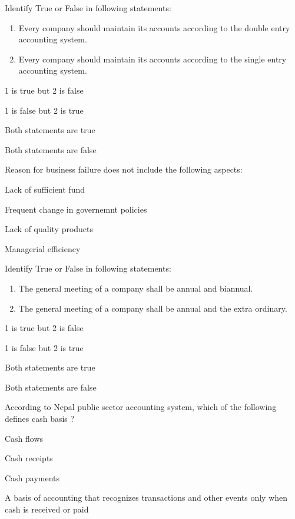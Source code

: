 \begin{questions}
\question Identify True or False in following statements:
  \begin{enumerate}
  \item Every company should maintain its accounts according to the double entry accounting system.
  \item Every company should maintain its accounts according to the single entry accounting system.
  \end{enumerate}

  \begin{items}
  \item 1 is true but 2 is false
  \item 1 is false but 2 is true
  \item Both statements are true
  \item Both statements are false
  \end{items}

\question Reason for business failure does not include the following aspects:
  \begin{items}
  \item Lack of sufficient fund
  \item Frequent change in governemnt policies
  \item Lack of quality products
  \item Managerial efficiency
  \end{items}

\question Identify True or False in following statements:
  \begin{enumerate}
  \item The general meeting of a company shall be annual and biannual.
  \item The general meeting of a company shall be annual and the extra ordinary.
  \end{enumerate}
  \begin{items}
  \item 1 is true but 2 is false
  \item 1 is false but 2 is true
  \item Both statements are true
  \item Both statements are false
  \end{items}

\question According to Nepal public sector accounting system, which of the following defines cash basis ?
  \begin{items}
  \item Cash flows
  \item Cash receipts
  \item Cash payments
  \item A basis of accounting that recognizes transactions and other events only when cash is received or paid
  \end{items}


\end{questions}
